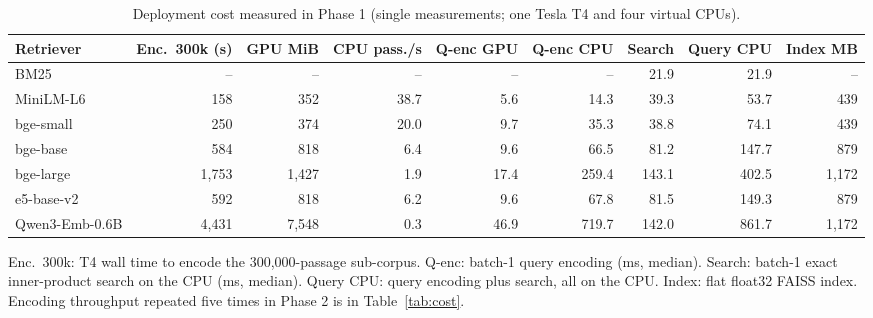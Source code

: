 \begin{table}[t]
\centering
\footnotesize
\setlength{\tabcolsep}{3.5pt}
\caption{Deployment cost measured in Phase 1 (single measurements; one Tesla T4 and four virtual CPUs).}
\label{tab:deploy}
\begin{tabular}{lrrrrrrrr}
\toprule
Retriever & Enc.\ 300k (s) & GPU MiB & CPU pass./s & Q-enc GPU & Q-enc CPU & Search & Query CPU & Index MB \\
\midrule
BM25 & -- & -- & -- & -- & -- & 21.9 & 21.9 & -- \\
MiniLM-L6 & 158 & 352 & 38.7 & 5.6 & 14.3 & 39.3 & 53.7 & 439 \\
bge-small & 250 & 374 & 20.0 & 9.7 & 35.3 & 38.8 & 74.1 & 439 \\
bge-base & 584 & 818 & 6.4 & 9.6 & 66.5 & 81.2 & 147.7 & 879 \\
bge-large & 1,753 & 1,427 & 1.9 & 17.4 & 259.4 & 143.1 & 402.5 & 1,172 \\
e5-base-v2 & 592 & 818 & 6.2 & 9.6 & 67.8 & 81.5 & 149.3 & 879 \\
Qwen3-Emb-0.6B & 4,431 & 7,548 & 0.3 & 46.9 & 719.7 & 142.0 & 861.7 & 1,172 \\
\bottomrule
\end{tabular}
\par\smallskip\parbox{\linewidth}{\footnotesize Enc.\ 300k: T4 wall time to encode the 300,000-passage sub-corpus. Q-enc: batch-1 query encoding (ms, median). Search: batch-1 exact inner-product search on the CPU (ms, median). Query CPU: query encoding plus search, all on the CPU. Index: flat float32 FAISS index. Encoding throughput repeated five times in Phase 2 is in Table~\ref{tab:cost}.}
\end{table}
